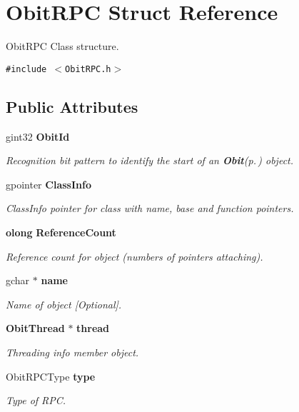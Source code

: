 \section{Obit\-RPC Struct Reference}
\label{structObitRPC}
Obit\-RPC Class structure.  


{\tt \#include $<$Obit\-RPC.h$>$}

\subsection*{Public Attributes}
\begin{CompactItemize}
\item 
gint32 {\bf Obit\-Id}
\begin{CompactList}\small\item\em Recognition bit pattern to identify the start of an {\bf Obit}{\rm (p.\,\pageref{structObit})} object. \item\end{CompactList}\item 
gpointer {\bf Class\-Info}
\begin{CompactList}\small\item\em Class\-Info pointer for class with name, base and function pointers. \item\end{CompactList}\item 
{\bf olong} {\bf Reference\-Count}
\begin{CompactList}\small\item\em Reference count for object (numbers of pointers attaching). \item\end{CompactList}\item 
gchar $\ast$ {\bf name}
\begin{CompactList}\small\item\em Name of object [Optional]. \item\end{CompactList}\item 
{\bf Obit\-Thread} $\ast$ {\bf thread}
\begin{CompactList}\small\item\em Threading info member object. \item\end{CompactList}\item 
Obit\-RPCType {\bf type}
\begin{CompactList}\small\item\em Type of RPC. \item\end{CompactList}\item 

\end{CompactItemize}
